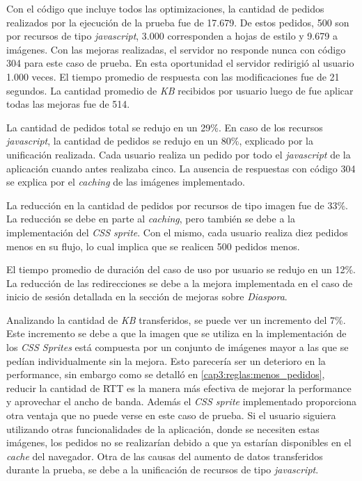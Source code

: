Con el código que incluye todos las optimizaciones, la cantidad de pedidos realizados por la ejecución de la prueba fue de 17.679. De estos
pedidos, 500 son por recursos de tipo \emph{javascript}, 3.000 corresponden a hojas de estilo y 9.679 a imágenes. Con las mejoras realizadas, el 
servidor no responde nunca con código 304 para este caso de prueba. En esta oportunidad el servidor redirigió al usuario 1.000 veces. El tiempo promedio de respuesta con las 
modificaciones fue de 21 segundos. La cantidad promedio de \emph{KB} recibidos por usuario luego de fue aplicar todas las mejoras fue de 514.

La cantidad de pedidos total se redujo en un 29\%. En caso de los recursos \emph{javascript}, la cantidad de pedidos se redujo en un 80\%, explicado por la unificación realizada. 
Cada usuario realiza un pedido por todo el \emph{javascript} de la aplicación cuando antes realizaba cinco. La ausencia de respuestas con código 304 se explica por el 
\emph{caching} de las imágenes implementado.

La reducción en la cantidad de pedidos por recursos de tipo imagen fue de 33\%. La reducción se debe en parte al \emph{caching}, pero también se debe a la implementación del 
\emph{CSS sprite}. Con el mismo, cada usuario realiza diez pedidos menos en su flujo, lo cual implica que  se realicen 500 pedidos menos.

El tiempo promedio de duración del caso de uso por usuario se redujo en un 12\%. La reducción de las redirecciones se debe a la mejora implementada en el caso de inicio de
sesión detallada en la sección de mejoras sobre \emph{Diaspora}.

Analizando la cantidad de \emph{KB} transferidos, se puede ver un incremento del 7\%. Este incremento se debe a que la imagen que se utiliza en la implementación de los
\emph{CSS Sprites} está compuesta por un conjunto de imágenes mayor a las que se pedían individualmente sin la mejora. Esto parecería ser un deterioro en la performance, sin
embargo como se detalló en \ref{cap3:reglas:menos_pedidos}, reducir la cantidad de RTT es la manera más efectiva de mejorar la performance y aprovechar el ancho de banda.
Además el \emph{CSS sprite} implementado proporciona otra ventaja que no puede verse en este caso de prueba. Si el usuario siguiera utilizando otras funcionalidades de la
aplicación, donde se necesiten estas imágenes, los pedidos no se realizarían debido a que ya estarían disponibles en el \emph{cache} del navegador. Otra de las causas del
aumento de datos transferidos durante la prueba, se debe a la unificación de recursos de tipo \emph{javascript}.

